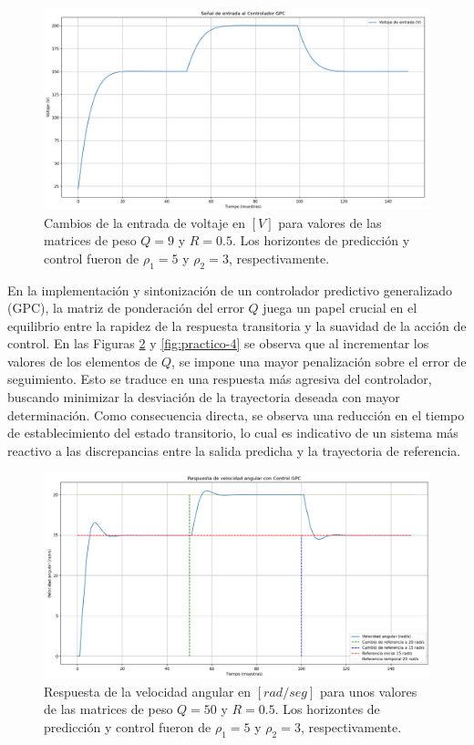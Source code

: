 \documentclass[journal]{IEEEtran}
\begin{document}
\begin{figure}[H]
    \centering
    \includegraphics[width=1\linewidth]{imagen_2.png}
    \caption{Cambios de la entrada de voltaje en $[V]$ para valores de las matrices de peso $Q = 9$ y $R= 0.5$. Los horizontes de predicción y control fueron de $\rho_1 = 5$  y $\rho_2 = 3$, respectivamente. }
    \label{fig:practico-2}
\end{figure}

En la implementación y sintonización de un controlador predictivo generalizado (GPC), la matriz de ponderación del error \( Q \) juega un papel crucial en el equilibrio entre la rapidez de la respuesta transitoria y la suavidad de la acción de control. En las Figuras \ref{fig:practico-3} y \ref{fig:practico-4} se observa que al incrementar los valores de los elementos de \( Q \), se impone una mayor penalización sobre el error de seguimiento. Esto se traduce en una respuesta más agresiva del controlador, buscando minimizar la desviación de la trayectoria deseada con mayor determinación. Como consecuencia directa, se observa una reducción en el tiempo de establecimiento del estado transitorio, lo cual es indicativo de un sistema más reactivo a las discrepancias entre la salida predicha y la trayectoria de referencia.


\begin{figure}[H]
    \centering
    \includegraphics[width=1\linewidth]{imagen-3.png}
    \caption{Respuesta de la velocidad angular en $[rad/seg]$ para unos valores de las matrices de peso $Q = 50$ y $R= 0.5$. Los horizontes de predicción y control fueron de $\rho_1 = 5$  y $\rho_2 = 3$, respectivamente. }
    \label{fig:practico-3}
\end{figure}
\end{document}
